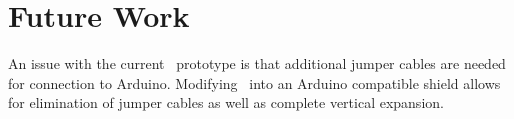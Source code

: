 \section{Future Work}
An issue with the current \papertitle\ prototype is that additional jumper cables are needed for connection to Arduino. Modifying \papertitle\ into an Arduino compatible shield allows for elimination of jumper cables as well as complete vertical expansion.